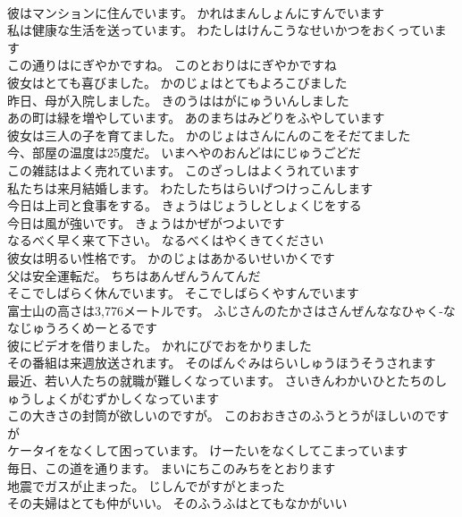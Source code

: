 \documentclass[8pt]{extreport}
\begin{document}
\begin{CJK}{UTF8}{min}
\\	彼はマンションに住んでいます。	かれはまんしょんにすんでいます 
\\	私は健康な生活を送っています。	わたしはけんこうなせいかつをおくっています 
\\	この通りはにぎやかですね。	このとおりはにぎやかですね 
\\	彼女はとても喜びました。	かのじょはとてもよろこびました 
\\	昨日、母が入院しました。	きのうははがにゅういんしました 
\\	あの町は緑を増やしています。	あのまちはみどりをふやしています 
\\	彼女は三人の子を育てました。	かのじょはさんにんのこをそだてました 
\\	今、部屋の温度は25度だ。	いまへやのおんどはにじゅうごどだ 
\\	この雑誌はよく売れています。	このざっしはよくうれています 
\\	私たちは来月結婚します。	わたしたちはらいげつけっこんします 
\\	今日は上司と食事をする。	きょうはじょうしとしょくじをする 
\\	今日は風が強いです。	きょうはかぜがつよいです 
\\	なるべく早く来て下さい。	なるべくはやくきてください 
\\	彼女は明るい性格です。	かのじょはあかるいせいかくです 
\\	父は安全運転だ。	ちちはあんぜんうんてんだ 
\\	そこでしばらく休んでいます。	そこでしばらくやすんでいます 
\\	富士山の高さは3,776メートルです。	ふじさんのたかさはさんぜんななひゃく-ななじゅうろくめーとるです 
\\	彼にビデオを借りました。	かれにびでおをかりました 
\\	その番組は来週放送されます。	そのばんぐみはらいしゅうほうそうされます 
\\	最近、若い人たちの就職が難しくなっています。	さいきんわかいひとたちのしゅうしょくがむずかしくなっています 
\\	この大きさの封筒が欲しいのですが。	このおおきさのふうとうがほしいのですが 
\\	ケータイをなくして困っています。	けーたいをなくしてこまっています 
\\	毎日、この道を通ります。	まいにちこのみちをとおります 
\\	地震でガスが止まった。	じしんでがすがとまった 
\\	その夫婦はとても仲がいい。	そのふうふはとてもなかがいい 

\end{CJK}
\end{document}

